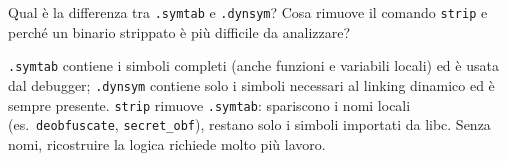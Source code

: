 \question[4]
Qual è la differenza tra \lstinline|.symtab| e \lstinline|.dynsym|? Cosa rimuove il comando \lstinline|strip| e perché un binario strippato è più difficile da analizzare?
\begin{solution}
\lstinline|.symtab| contiene i simboli completi (anche funzioni e variabili locali) ed è usata dal debugger; \lstinline|.dynsym| contiene solo i simboli necessari al linking dinamico ed è sempre presente.
\lstinline|strip| rimuove \lstinline|.symtab|: spariscono i nomi locali (es.\ \lstinline|deobfuscate|, \lstinline|secret_obf|), restano solo i simboli importati da libc. Senza nomi, ricostruire la logica richiede molto più lavoro.
\end{solution}
